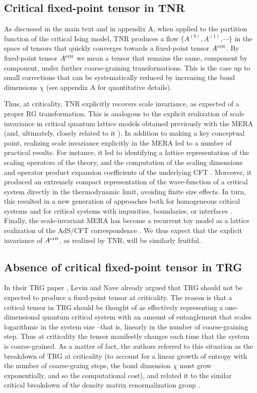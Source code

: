 \documentclass[aps,prl,twocolumn,showpacs,superscriptaddress,floatfix,10pt]{revtex4-1}
\def\CRI{\mbox{\scriptsize crit}}
\begin{document}
\subsection{Critical fixed-point tensor in TNR}

As discussed in the main text and in appendix A, when applied to the partition function of the critical Ising model, TNR produces a flow $\{A^{(0)}, A^{(1)}, \cdots \}$ in the space of tensors that quickly converges towards a fixed-point tensor $A^{\CRI}$. By fixed-point tensor $A^{\CRI}$ we mean a tensor that remains the same, component by component, under further coarse-graining transformations. This is the case up to small corrections that can be systematically reduced by increasing the bond dimensions $\chi$ (see appendix A for quantitative details).

Thus, at criticality, TNR explicitly recovers scale invariance, as expected of a proper RG transformation. This is analogous to the explicit realization of scale invariance in critical quantum lattice models obtained previously with the MERA \cite{MERA,MERACFT} (and, ultimately, closely related to it \cite{TNRtoMERA}). In addition to making a key conceptual point, realizing scale invariance explicitly in the MERA led to a number of practical results. For instance, it led to identifying a lattice representation of the scaling operators of the theory, and the computation of the scaling dimensions and operator product expansion coefficients of the underlying CFT \cite{MERACFT}. Moreover, it produced an extremely compact representation of the wave-function of a critical system directly in the thermodynamic limit, avoiding finite size effects. In turn, this resulted in a new generation of approaches both for homogeneous critical systems \cite{MERACFT} and for critical systems with impurities, boundaries, or interfaces \cite{MERAboundary}. Finally, the scale-invariant MERA has become a recurrent toy model as a lattice realization of the AdS/CFT correspondence \cite{Swingle}.  We thus expect that the explicit invariance of $A^{\CRI}$, as realized by TNR, will be similarly fruitful.

\subsection{Absence of critical fixed-point tensor in TRG}

In their TRG paper \cite{TRG}, Levin and Nave already argued that TRG should not be expected to produce a fixed-point tensor at criticality. The reason is that a critical tensor in TRG should be thought of as effectively representing a one-dimensional quantum critical system with an amount of entanglement that scales logarithmic in the system size --that is, linearly in the number of coarse-graining step. Thus at criticality the tensor manifestly changes each time that the system is coarse-grained. As a matter of fact, the authors referred to this situation as the breakdown of TRG at criticality (to account for a linear growth of entropy with the number of coarse-graing steps, the bond dimension $\chi$ must grow exponentially, and so the computational cost), and related it to the similar critical breakdown of the density matrix renormalization group \cite{DMRG}. 
\end{document}
